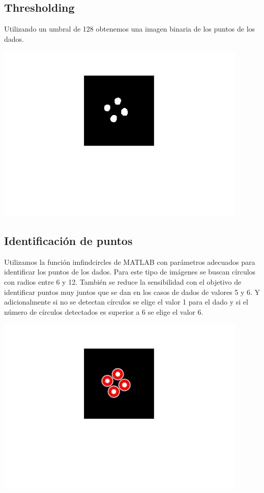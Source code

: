 \newpage

\subsection{Thresholding}
Utilizando un umbral de 128 obtenemos una imagen binaria de los puntos de los dados.

\begin{center}
    \includegraphics[width=0.9\textwidth]{ImagenesLatex/dots.jpg}
\end{center}

\subsection{Identificación de puntos}
Utilizamos la función imfindcircles de MATLAB con parámetros adecuados para identificar los puntos de los dados. Para este tipo de imágenes se buscan círculos con radios entre 6 y 12. También se reduce la sensibilidad con el objetivo de identificar puntos muy juntos que se dan en los casos de dados de valores 5 y 6. Y adicionalmente si no se detectan círculos se elige el valor 1 para el dado y si el número de círculos detectados es superior a 6 se elige el valor 6.
\begin{center}
    \includegraphics[width=0.9\textwidth]{ImagenesLatex/circles.jpg}
\end{center}


